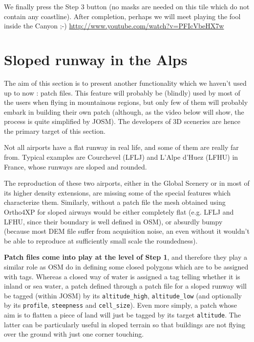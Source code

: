 \documentclass[12pt]{article}
\begin{document}
We finally press the Step 3 button (no masks are needed on this tile which do not contain any coastline).  After completion, perhaps we will meet playing the fool inside the Canyon ;-)  \href{http://www.youtube.com/watch?v=PFIcVbeHX7w}{http://www.youtube.com/watch?v=PFIcVbeHX7w}

\section{Sloped runway in the Alps}\label{alps}

The aim of this section is to present another functionality which we haven't used up to now : patch files. This feature will probably be (blindly) used by most of the users when flying in mountainous regions, but only few of them will probably embark in building their own patch (although, as the video below will show, the process is quite simplified by JOSM). The developers of 3D sceneries are hence the primary target of this section.

Not all airports have a flat runway in real life, and some of them are really far from.
Typical examples are Courchevel (LFLJ) and L'Alpe d'Huez (LFHU) in France, whose runways are sloped and rounded.

The reproduction of these two airports, either in the Global Scenery or in most of its higher density extensions, are missing some of the special features which characterize them. Similarly, without a patch file the mesh obtained using Ortho4XP for sloped airways would be either completely flat (e.g. LFLJ and LFHU, since their boundary is well defined in OSM), or absurdly bumpy (because most DEM file suffer from acquisition noise, an even without it wouldn't be able to reproduce at sufficiently small scale the roundedness).

{\bf Patch files come into play at the level of Step 1}, and therefore they play a similar role as OSM do in defining some closed polygons which are to be assigned with tags.
Whereas a closed way of water is assigned a tag telling whether it is inland or sea water, a patch defined through a patch file for a sloped runway will be tagged (within JOSM) by its {\tt altitude\_high}, {\tt altitude\_low} (and optionally by its {\tt profile}, {\tt steepness} and {\tt cell\_size}).
Even more simply, a patch whose aim is to flatten a piece of land will just be tagged by its target {\tt altitude}. The latter can be particularly useful in sloped terrain so that buildings are not flying over the ground  with just one corner touching.
\end{document}
